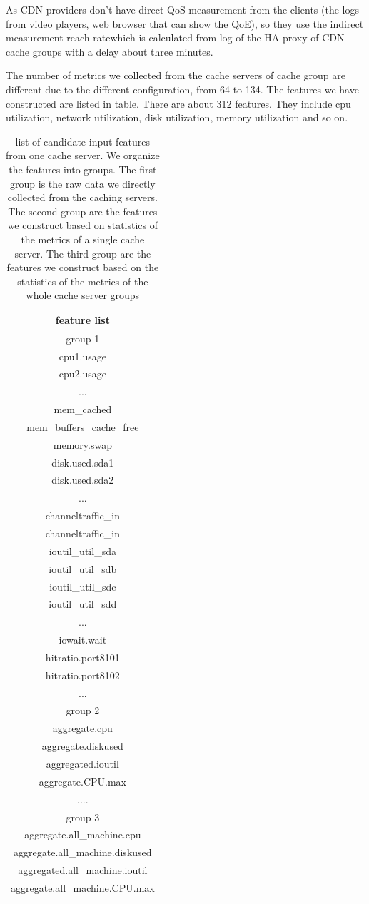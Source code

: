 \documentclass[5p]{elsarticle}
\newcommand{\dabiaolv}{reach rate}
\begin{document}
As CDN providers don't have direct QoS measurement from the clients (the logs from video players, web browser that can show the QoE), so they use the indirect measurement \dabiaolv which is calculated from log of the HA proxy of CDN cache groups with a delay about three minutes. 

The number of metrics we collected from the cache servers of cache group are different due to the different configuration, from 64 to 134. The features we have constructed are listed in table. There are about 312 features. They include cpu utilization, network utilization, disk utilization, memory utilization and so on.

\begin{table}[]
\centering
\begin{tabular}{|c|}
\hline  
feature list\\
\hline  
group 1\\
\hline  
cpu1.usage\\
cpu2.usage\\
...  \\
mem\_cached\\
mem\_buffers\_cache\_free\\
memory.swap\\ 
disk.used.sda1\\
disk.used.sda2\\
...\\
channeltraffic\_in\\
channeltraffic\_in\\
ioutil\_util\_sda\\
ioutil\_util\_sdb\\
ioutil\_util\_sdc\\
ioutil\_util\_sdd\\
...\\
iowait.wait\\
hitratio.port8101\\
hitratio.port8102\\
...\\
\hline  
group 2\\
\hline 
aggregate.cpu\\
aggregate.diskused\\
aggregated.ioutil\\
aggregate.CPU.max\\
....\\
\hline  
group 3\\
\hline 
aggregate.all\_machine.cpu\\
aggregate.all\_machine.diskused\\
aggregated.all\_machine.ioutil\\
aggregate.all\_machine.CPU.max\\
\hline
\end{tabular}
\caption{list of candidate input features from one cache server. We organize the features into groups. The first group is the raw data we directly collected from the caching servers. The second group are the features we construct based on statistics of the metrics of a single cache server. The third group are the features we construct based on the statistics of the metrics of the whole cache server groups}
\label{my-label}
\end{table}
\end{document}
